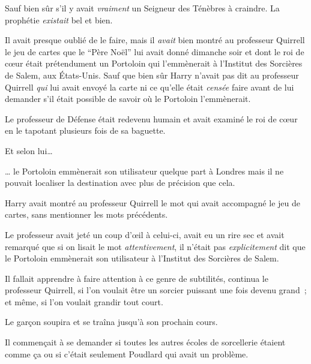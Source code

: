 Sauf bien sûr s'il y avait \emph{vraiment} un Seigneur des Ténèbres à craindre. La prophétie \emph{existait} bel et bien.

Il avait presque oublié de le faire, mais il \emph{avait} bien montré au professeur Quirrell le jeu de cartes que le “Père Noël” lui avait donné dimanche soir et dont le roi de cœur était prétendument un Portoloin qui l'emmènerait à l'Institut des Sorcières de Salem, aux États-Unis. Sauf que bien sûr Harry n'avait pas dit au professeur Quirrell \emph{qui} lui avait envoyé la carte ni ce qu'elle était \emph{censée} faire avant de lui demander s'il était possible de savoir où le Portoloin l'emmènerait.

Le professeur de Défense était redevenu humain et avait examiné le roi de cœur en le tapotant plusieurs fois de sa baguette.

Et selon lui…

… le Portoloin emmènerait son utilisateur quelque part à Londres mais il ne pouvait localiser la destination avec plus de précision que cela.

Harry avait montré au professeur Quirrell le mot qui avait accompagné le jeu de cartes, sans mentionner les mots précédents.

Le professeur avait jeté un coup d'œil à celui-ci, avait eu un rire sec et avait remarqué que si on lisait le mot \emph{attentivement}, il n'était pas \emph{explicitement} dit que le Portoloin emmènerait son utilisateur à l'Institut des Sorcières de Salem.

Il fallait apprendre à faire attention à ce genre de subtilités, continua le professeur Quirrell, si l'on voulait être un sorcier puissant une fois devenu grand~; et même, si l'on voulait grandir tout court.

Le garçon soupira et se traîna jusqu'à son prochain cours.

Il commençait à se demander si toutes les autres écoles de sorcellerie étaient comme ça ou si c'était seulement Poudlard qui avait un problème.
